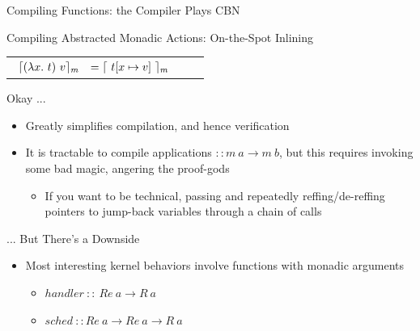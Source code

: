 \documentclass{beamer}
\begin{document}

\begin{frame}{Compiling Functions: the Compiler Plays CBN}

\begin{structure}{Compiling Abstracted Monadic Actions: On-the-Spot Inlining}
\begin{onlinebox}{8cm}

\begin{tabular}[t]{lll}
$
\begin{array}[t]{lll}

\lceil (\lambda x.\ t)\ v \rceil_m& = \lceil \ t[x \mapsto v] \ \rceil_m \\

\end{array}
$
\end{tabular}

\end{onlinebox}
\end{structure}

\medskip

\begin{structure}{Okay ...}
\begin{itemize}

\item{Greatly simplifies compilation, and hence verification}

\item{It is tractable to compile applications $:: m\ a \rightarrow m\ b$, but this requires invoking some bad magic, angering the proof-gods}
\begin{itemize}\item{If you want to be technical, passing and repeatedly reffing/de-reffing pointers to jump-back variables through a chain of calls}\end{itemize}

\end{itemize}
\end{structure}

\pause

\begin{structure}{... But There's a Downside}

\begin{itemize}
\item{Most interesting kernel behaviors involve functions with monadic arguments}
  \begin{itemize}
  \item{$handler\ ::\ Re\ a \rightarrow R\ a$}
  \item{$sched\ :: Re\ a \rightarrow Re\ a \rightarrow R\ a$}
  \end{itemize}
  

\end{itemize}
\end{structure}
\end{frame}
\end{document}
